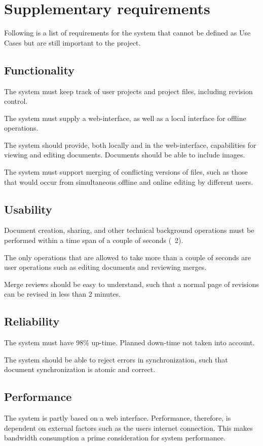 \section{Supplementary requirements}
\label{sec:Supplementary Requirements}

Following is a list of requirements for the system that cannot be defined as Use Cases %
but are still important to the project.

\subsection{Functionality}
The system must keep track of user projects and project files, including revision control.

The system must supply a web-interface, as well as a local interface for offline operations.

The system should provide, both locally and in the web-interface, capabilities for viewing and editing documents. Documents should be able to include images.

The system must support merging of conflicting versions of files, such as those that would occur from simultaneous offline and online editing by different users.

\subsection{Usability}
Document creation, sharing, and other technical background operations must be performed within a time span of a couple of seconds (~2).

The only operations that are allowed to take more than a couple of seconds are user operations such as editing documents and reviewing merges.

Merge reviews should be easy to understand, such that a normal page of revisions can be revised in less than 2 minutes.

\subsection{Reliability}
The system must have 98\% up-time. Planned down-time not taken into account.

The system should be able to reject errors in synchronization, such that document synchronization is atomic and correct.

\subsection{Performance}
The system is partly based on a web interface. Performance, therefore, is dependent on external factors such as the users internet connection.
This makes bandwidth consumption a prime consideration for system performance.

